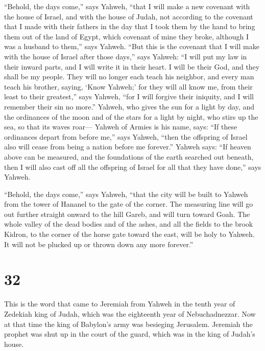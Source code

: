  ``Behold, the days come,'' says Yahweh, ``that I will make
a new covenant with the house of Israel, and with the house of Judah,
 not according to the covenant that I made with their
fathers in the day that I took them by the hand to bring them out of the
land of Egypt, which covenant of mine they broke, although I was a
husband to them,'' says Yahweh.  ``But this is the covenant
that I will make with the house of Israel after those days,'' says
Yahweh: ``I will put my law in their inward parts, and I will write it
in their heart. I will be their God, and they shall be my people.
 They will no longer each teach his neighbor, and every man
teach his brother, saying, `Know Yahweh;' for they will all know me,
from their least to their greatest,'' says Yahweh, ``for I will forgive
their iniquity, and I will remember their sin no more.'' 
Yahweh, who gives the sun for a light by day, and the ordinances of the
moon and of the stars for a light by night, who stirs up the sea, so
that its waves roar--- Yahweh of Armies is his name, says: 
``If these ordinances depart from before me,'' says Yahweh, ``then the
offspring of Israel also will cease from being a nation before me
forever.''  Yahweh says: ``If heaven above can be measured,
and the foundations of the earth searched out beneath, then I will also
cast off all the offspring of Israel for all that they have done,'' says
Yahweh.

 ``Behold, the days come,'' says Yahweh, ``that the city
will be built to Yahweh from the tower of Hananel to the gate of the
corner.  The measuring line will go out further straight
onward to the hill Gareb, and will turn toward Goah.  The
whole valley of the dead bodies and of the ashes, and all the fields to
the brook Kidron, to the corner of the horse gate toward the east, will
be holy to Yahweh. It will not be plucked up or thrown down any more
forever.''

\hypertarget{section-31}{%
\section{32}\label{section-31}}

 This is the word that came to Jeremiah from Yahweh in the
tenth year of Zedekiah king of Judah, which was the eighteenth year of
Nebuchadnezzar.  Now at that time the king of Babylon's army
was besieging Jerusalem. Jeremiah the prophet was shut up in the court
of the guard, which was in the king of Judah's house.

